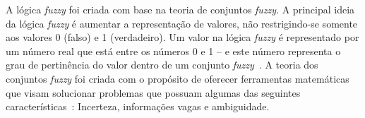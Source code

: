 \documentclass[12pt]{article}
\begin{document}
A lógica \textit{fuzzy} foi criada com base na teoria de conjuntos \textit{fuzzy}. A principal ideia da lógica \textit{fuzzy} é aumentar a representação de valores, não restrigindo-se somente aos valores 0 (falso) e 1 (verdadeiro). Um valor na lógica \textit{fuzzy} é representado por um número real que está entre os números 0 e 1 -- e este número representa o grau de pertinência do valor dentro de um conjunto \textit{fuzzy}~\cite{boclin:06}. A teoria dos conjuntos \textit{fuzzy} foi criada com o propósito de oferecer ferramentas matemáticas que visam solucionar problemas que possuam algumas das seguintes características~\cite{falcao:02}: Incerteza, informações vagas e ambiguidade.

\end{document}
